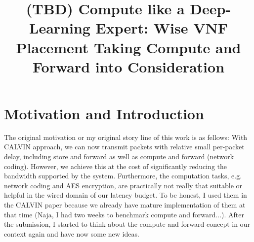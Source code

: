 \documentclass[12pt]{article}
\title{
    (TBD) Compute like a Deep-Learning Expert: Wise VNF Placement Taking Compute and Forward into Consideration
}
\author{}
\date{}
\begin{document}
\maketitle

\section{Motivation and Introduction}%
\label{sec:motivation_introduction}

The original motivation or my original story line of this work is as fellows: With CALVIN approach, we can now transmit
packets with relative small per-packet delay, including store and forward as well as compute and forward (network
coding). However, we achieve this at the cost of significantly reducing the bandwidth supported by the system.
Furthermore, the computation tasks, e.g. network coding and AES encryption, are practically not really that suitable or
helpful in the wired domain of our latency budget. To be honest, I used them in the CALVIN paper because we already have
mature implementation of them at that time (Naja, I had two weeks to benchmark compute and forward...). After the
submission, I started to think about the compute and forward concept in our context again and have now some new ideas.
\end{document}
